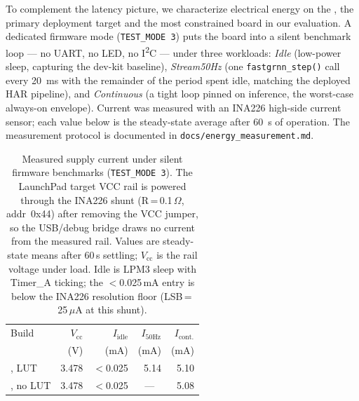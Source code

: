 To complement the latency picture, we characterize electrical energy
on the \msp{}, the primary deployment target and the most constrained
board in our evaluation. A dedicated firmware mode
(\texttt{TEST\_MODE 3}) puts the board into a silent benchmark loop ---
no UART, no LED, no I\textsuperscript{2}C --- under three workloads:
\textit{Idle} (low-power sleep, capturing the dev-kit baseline),
\textit{Stream50Hz} (one \texttt{fastgrnn\_step()} call every 20~ms
with the remainder of the period spent idle, matching the deployed
HAR pipeline), and \textit{Continuous} (a tight loop pinned on
inference, the worst-case always-on envelope). Current was measured
with an INA226 high-side current sensor; each value below is the
steady-state average after 60~s of operation. The measurement
protocol is documented in \texttt{docs/energy\_measurement.md}.

\begin{table}[t]
\centering
\caption{Measured \msp{} supply current under silent firmware
benchmarks (\texttt{TEST\_MODE~3}). The LaunchPad target VCC rail is
powered through the INA226 shunt (R\,=\,0.1\,$\Omega$, addr~0x44)
after removing the VCC jumper, so the USB/debug bridge draws no current
from the measured rail. Values are steady-state means after 60\,s
settling; $V_{\text{cc}}$ is the rail voltage under load. Idle is
LPM3 sleep with Timer\_A ticking; the $<$0.025\,mA entry is below the
INA226 resolution floor (LSB\,=\,25\,$\mu$A at this shunt).}
\label{tab:energy}
\begin{tabular}{lrrrr}
\toprule
Build & $V_{\text{cc}}$ & $I_{\text{idle}}$ & $I_{50\text{Hz}}$ & $I_{\text{cont.}}$ \\
      & (V)             & (mA)              & (mA)              & (mA) \\
\midrule
\msp{}, LUT    & 3.478 & $<$0.025 & 5.14 & 5.10 \\
\msp{}, no LUT & 3.478 & $<$0.025 & \multicolumn{1}{c}{---} & 5.08 \\
\bottomrule
\end{tabular}
\end{table}

